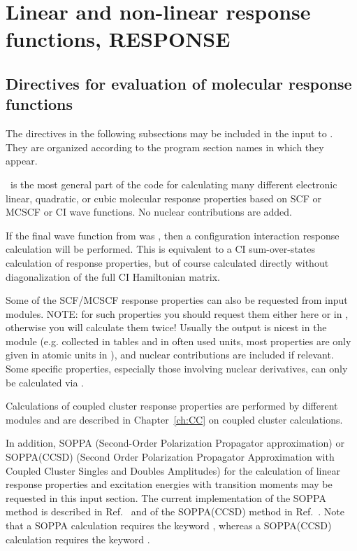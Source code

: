 \chapter{Linear and non-linear response functions, RESPONSE}
\label{ch:response}

\section{Directives for evaluation of molecular response functions}\label{sec:rspinp}

The directives in the following subsections may be included in the input to \resp.
They are organized according to the program section names in which they
appear.

\resp\ is the most general part of the code for calculating 
many different electronic linear, quadratic, or cubic molecular
response properties based on SCF or MCSCF or CI wave functions.
No nuclear contributions are added.

If the final wave function from  was , then
a configuration interaction
response calculation will be performed. 
This is equivalent to a CI sum-over-states
calculation of response properties,
but of course calculated directly without diagonalization of the full
CI Hamiltonian matrix.

Some of the SCF/MCSCF response properties can also be requested
from  input modules.
NOTE: for such properties you should request them either here or
in , otherwise you will calculate them twice!
Usually the output is nicest in
the  module (e.g. collected in tables and in
often used units, most properties are only given in atomic
units in \resp), and nuclear contributions are included if relevant.
Some specific properties, especially those involving nuclear derivatives,
can only be calculated via .

Calculations of coupled cluster response properties are performed
by different modules and are described
in Chapter~\ref{ch:CC} on coupled cluster calculations.

In addition, SOPPA
(Second-Order Polarization Propagator 
approximation) or SOPPA(CCSD) (Second Order Polarization
Propagator Approximation with Coupled Cluster Singles and Doubles Amplitudes) 
for the calculation of linear response
properties and excitation energies with transition moments
may be requested in this input section. The current
implementation of the SOPPA method is described 
in Ref.~\cite{mjpekdtehjajjojcp} and of the SOPPA(CCSD) method in 
Ref.~\cite{soppaccsd}. Note that a SOPPA calculation
requires the keyword , whereas a SOPPA(CCSD) calculation requires
the keyword .


